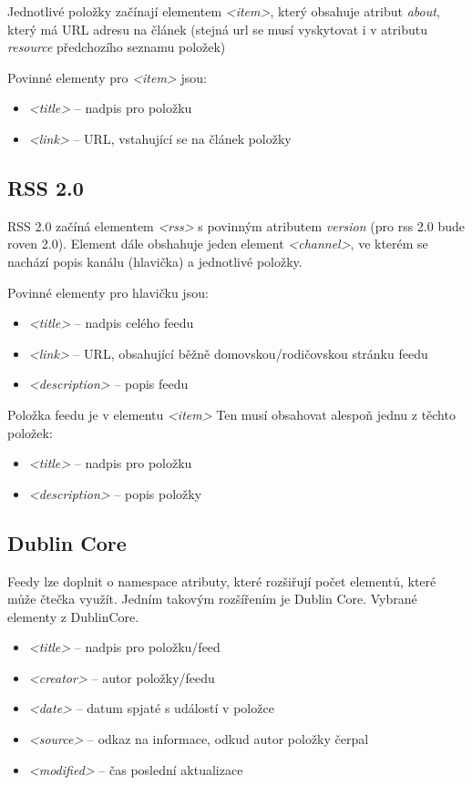 \documentclass[11pt] {article}
\begin{document}
Jednotlivé položky začínají elementem \emph{<item>}, který obsahuje atribut \emph{about}, který má URL adresu na článek (stejná url se musí vyskytovat i v atributu \emph{resource} předchozího seznamu položek)\newline

Povinné elementy pro \emph{<item>} jsou:
\begin{itemize}
\item \emph{<title>} -- nadpis pro položku
\item \emph{<link>} -- URL, vstahující se na článek položky
\end{itemize}

\subsection{RSS 2.0}
\hspace{5mm}RSS 2.0 začíná elementem \emph{<rss>} s povinným atributem \emph{version} (pro rss 2.0 bude roven 2.0). Element dále obshahuje jeden element \emph{<channel>}, ve kterém se nachází popis kanálu (hlavička) a jednotlivé položky. \cite{rss20} \cite{rss21}

Povinné elementy pro hlavičku jsou:
\begin{itemize}
\item \emph{<title>} -- nadpis celého feedu
\item \emph{<link>} -- URL, obsahující běžně domovskou/rodičovskou stránku feedu 
\item \emph{<description>} -- popis feedu\newline
\end{itemize}

Položka feedu je v elementu \emph{<item>} Ten musí obsahovat alespoň jednu z těchto položek:
\begin{itemize}
\item \emph{<title>} -- nadpis pro položku
\item \emph{<description>} -- popis položky
\end{itemize}

\subsection{Dublin Core}
\hspace{5mm}Feedy lze doplnit o namespace atributy, které rozšiřují počet elementů, které může čtečka využít. Jedním takovým rozšířením je Dublin Core. \newline
Vybrané elementy z DublinCore. \cite{dc1} \cite{dc2}
\begin{itemize}
\item \emph{<title>} -- nadpis pro položku/feed
\item \emph{<creator>} -- autor položky/feedu
\item \emph{<date>} -- datum spjaté s událostí v položce
\item \emph{<source>} -- odkaz na informace, odkud autor položky čerpal
\item \emph{<modified>} -- čas poslední aktualizace
\end{itemize}
\end{document}
